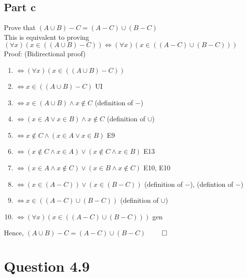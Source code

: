 \documentclass{article}
\begin{document}
		\subsection{Part c}
			Prove that $(A \cup B) - C = (A - C) \cup (B - C)$ \\
			This is equivalent to proving $(\forall x)(x \in ((A \cup B) - C)) \Leftrightarrow (\forall x)(x \in ((A - C) \cup (B - C)))$ \\
			Proof: (Bidirectional proof) \\
			\begin{enumerate}
				\item $\Leftrightarrow (\forall x)(x \in ((A \cup B) - C))$ 
				\item $\Leftrightarrow x \in ((A \cup B) - C)$ \hfill UI
				\item $\Leftrightarrow x \in (A \cup B) \land x \notin C$ \hfill (definition of $-$)
				\item $\Leftrightarrow (x \in A \lor x \in B) \land x \notin C$ \hfill (definition of $\cup$)
				\item $\Leftrightarrow x \notin C \land (x \in A \lor x \in B)$ \hfill E9
				\item $\Leftrightarrow (x \notin C \land x \in A) \lor (x \notin C \land x \in B)$ \hfill E13
				\item $\Leftrightarrow (x \in A \land x \notin C) \lor (x \in B \land x \notin C)$ \hfill E10, E10
				\item $\Leftrightarrow (x \in (A - C)) \lor (x \in (B - C))$ \hfill (definition of $-$), (defintion of $-$)
				\item $\Leftrightarrow x \in ((A - C) \cup (B - C))$ \hfill (definition of $\cup$)
				\item $\Leftrightarrow (\forall x)(x \in ((A - C) \cup (B - C)))$ \hfill gen
			\end{enumerate}
			Hence, $(A \cup B) - C = (A - C) \cup (B - C)$ \hfill $\qed$
	\section{Question 4.9}
\end{document}
